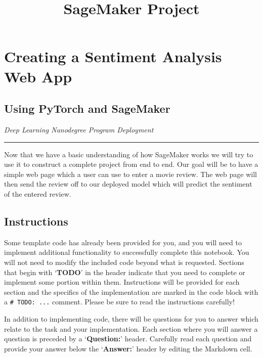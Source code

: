 \documentclass[11pt]{article}
\title{SageMaker Project}
\begin{document}
    
    \maketitle
    
    

    
    \hypertarget{creating-a-sentiment-analysis-web-app}{%
\section{Creating a Sentiment Analysis Web
App}\label{creating-a-sentiment-analysis-web-app}}

\hypertarget{using-pytorch-and-sagemaker}{%
\subsection{Using PyTorch and
SageMaker}\label{using-pytorch-and-sagemaker}}

\emph{Deep Learning Nanodegree Program \textbar{} Deployment}

\begin{center}\rule{0.5\linewidth}{0.5pt}\end{center}

Now that we have a basic understanding of how SageMaker works we will
try to use it to construct a complete project from end to end. Our goal
will be to have a simple web page which a user can use to enter a movie
review. The web page will then send the review off to our deployed model
which will predict the sentiment of the entered review.

\hypertarget{instructions}{%
\subsection{Instructions}\label{instructions}}

Some template code has already been provided for you, and you will need
to implement additional functionality to successfully complete this
notebook. You will not need to modify the included code beyond what is
requested. Sections that begin with `\textbf{TODO}' in the header
indicate that you need to complete or implement some portion within
them. Instructions will be provided for each section and the specifics
of the implementation are marked in the code block with a
\texttt{\#\ TODO:\ ...} comment. Please be sure to read the instructions
carefully!

In addition to implementing code, there will be questions for you to
answer which relate to the task and your implementation. Each section
where you will answer a question is preceded by a `\textbf{Question:}'
header. Carefully read each question and provide your answer below the
`\textbf{Answer:}' header by editing the Markdown cell.
\end{document}
